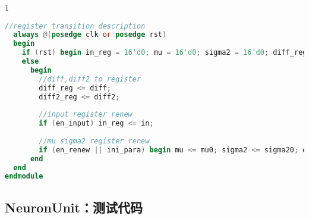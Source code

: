 \begin{spacing}{1}
\begin{lstlisting}[language=Verilog]
  //register transition description
  always @(posedge clk or posedge rst)
  begin
    if (rst) begin in_reg = 16'd0; mu = 16'd0; sigma2 = 16'd0; diff_reg = 16'd0; diff2_reg = 16'd0; /*divider_flag = 0; norm_dist = 16'd0;*/ end
    else
      begin
        //diff,diff2 to register
        diff_reg <= diff;
        diff2_reg <= diff2;
        
        //input register renew
        if (en_input) in_reg <= in;
        
        //mu sigma2 register renew
        if (en_renew || ini_para) begin mu <= mu0; sigma2 <= sigma20; end
      end
  end
endmodule
\end{lstlisting}
\end{spacing}

\subsection{NeuronUnit：测试代码}

